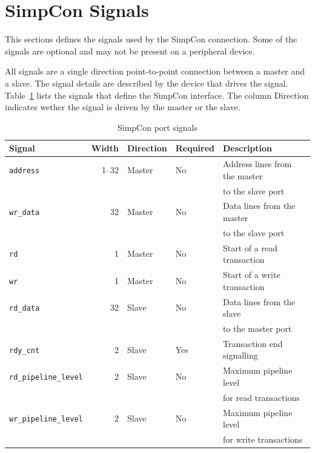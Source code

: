 \documentclass[a4paper,12pt]{scrartcl}
\newcommand{\sign}[1]{{\texttt{#1}}}
\begin{document}
\section{SimpCon Signals}

This sections defines the signals used by the SimpCon connection.
Some of the signals are optional and may not be present on a
peripheral device.

All signals are a single direction point-to-point connection between
a master and a slave. The signal details are described by the device
that drives the signal. Table~\ref{tab:sc:signals} lists the signals
that define the SimpCon interface. The column Direction indicates
wether the signal is driven by the master or the slave.

\begin{table}
    \centering

    \begin{tabular}{lrlll}
        \toprule
        Signal & Width & Direction & Required & Description \\
        \midrule
        \sign{address} & 1--32 & Master & No & Address lines from the
        master\\
        & & & & to the slave port\\
        \sign{wr\_data} & 32 & Master & No & Data lines from the
        master\\
        & & & & to the slave port\\
        \sign{rd} & 1 & Master & No & Start of a read transaction \\
        \sign{wr} & 1 & Master & No & Start of a write transaction \\
        \sign{rd\_data} & 32 & Slave & No & Data lines from the
        slave\\
        & & & & to the master port\\
        \sign{rdy\_cnt} & 2 & Slave & Yes & Transaction end signalling \\
        \sign{rd\_pipeline\_level} & 2 & Slave & No & Maximum pipeline
        level\\
        & & & & for read transactions \\
        \sign{wr\_pipeline\_level} & 2 & Slave & No & Maximum pipeline
        level\\
        & & & & for write transactions \\
        \bottomrule

    \end{tabular}
    \caption{SimpCon port signals}
    \label{tab:sc:signals}

\end{table}
\end{document}
